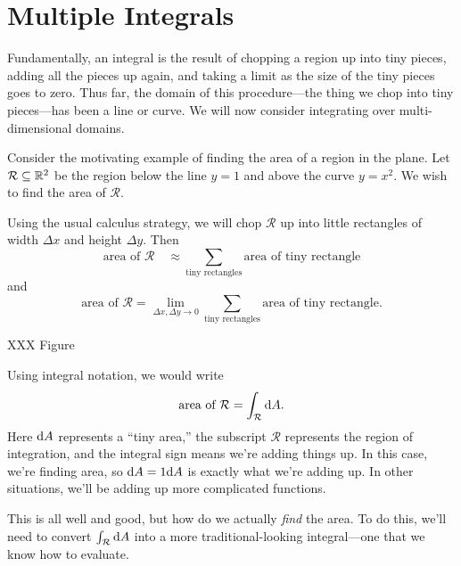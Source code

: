 \section{Multiple Integrals}

Fundamentally, an integral is the result of chopping a region up into tiny
pieces, adding all the pieces up again, and taking a limit as the size of
the tiny pieces goes to zero.  Thus far, the domain of this procedure---the
thing we chop into tiny pieces---has been a line or curve.  We will now consider
integrating over multi-dimensional domains.

Consider the motivating example of finding the area of a region in the plane.
Let $\mathcal R\subseteq \mathbb{R}^2$ be the region below the line $y=1$ and above the
curve $y=x^2$.  We wish to find the area of $\mathcal R$.

Using the usual calculus strategy, we will chop $\mathcal R$ up into little rectangles
of width $\Delta x$ and height $\Delta y$.  Then
\[
	\text{area of }\mathcal R \quad\approx \sum_{\text{tiny rectangles}}\text{area of tiny rectangle}
\]
and
\[
	\text{area of }\mathcal R =\lim_{\Delta x,\Delta y\to 0} \sum_{\text{tiny rectangles}}\text{area of tiny rectangle}.
\]

XXX Figure

Using integral notation, we would write
\[
	\text{area of }\mathcal R=\int_{\mathcal R} \mathrm{d} A.
\]
Here $\mathrm{d} A$ represents a ``tiny area,'' the subscript $\mathcal R$ represents the region of integration,
and the integral sign means we're adding things up.  In this case, we're finding area, so $\mathrm{d} A=1\mathrm{d} A$ is
exactly what we're adding up.  In other situations, we'll be adding up more complicated functions.

This is all well and good, but how do we actually \emph{find} the area.  To do this, we'll
need to convert $\int_{\mathcal R}\mathrm{d} A$ into a more traditional-looking integral---one that we
know how to evaluate.

